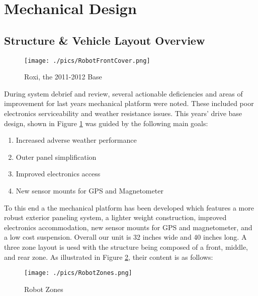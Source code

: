 \section{Mechanical Design}

\subsection{Structure \& Vehicle Layout Overview}

\begin{figure}[H]
\begin{center}
\texttt{[image: ./pics/RobotFrontCover.png]}
\caption{Roxi, the 2011-2012 Base}
\label{FIG:Roxi}
\end{center}
\end{figure}


  During system debrief and review, several actionable deficiencies and areas of improvement for last years mechanical platform were noted. These included poor electronics serviceability and weather resistance issues. This years' drive base design, shown in Figure \ref{FIG:Roxi} was guided by the following main goals:

\begin{enumerate}
\item Increased adverse weather performance
\item Outer panel simplification
\item Improved electronics access
\item New sensor mounts for GPS and Magnetometer
\end{enumerate}

To this end a the mechanical platform has been developed which features a more robust exterior paneling system, a lighter weight construction, improved electronics accommodation, new sensor mounts for GPS and magnetometer, and a low cost suspension. Overall our unit is 32 inches wide and 40 inches long. A three zone layout is uesd with the structure being composed of a front, middle, and rear zone. As illustrated in Figure \ref{FIG:Zones}, their content is as follows:

\begin{figure}[H]
\begin{center}
\texttt{[image: ./pics/RobotZones.png]}
\caption{Robot Zones}
\label{FIG:Zones}
\end{center}
\end{figure}

